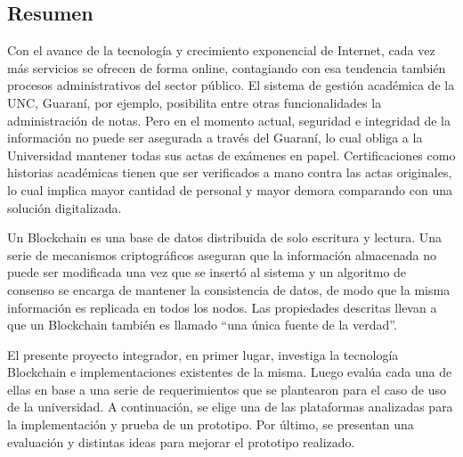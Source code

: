 \documentclass[11pt, oneside]{Thesis} %
\begin{document}
\clearpage %

\pagebreak


\newpage
\vspace*{\fill}
\begin{center}
\section*{Resumen}
\end{center}
Con el avance de la tecnología y crecimiento exponencial de Internet, cada vez más servicios se ofrecen de forma online, contagiando con esa tendencia también procesos administrativos del sector público. El sistema 
de gestión académica de la UNC, Guaraní, por ejemplo, posibilita entre otras funcionalidades la administración de notas. Pero en el momento actual, seguridad e integridad de la información no puede ser asegurada a través del Guaraní, lo cual obliga a la Universidad mantener todas sus actas de exámenes en papel. Certificaciones como historias académicas tienen que ser verificados a mano contra las actas originales, lo cual implica mayor cantidad de personal y mayor demora comparando con una solución digitalizada. 

Un Blockchain es una base de datos distribuida de solo escritura y lectura. Una serie de mecanismos criptográficos aseguran que la información almacenada no puede ser modificada una vez que se insertó al sistema y un algoritmo de consenso se encarga de mantener la consistencia de datos, de modo que la misma información es replicada en todos los nodos. Las propiedades descritas llevan a que un Blockchain también es llamado ``una única fuente de la verdad''. 

El presente proyecto integrador, en primer lugar, investiga la tecnología Blockchain e implementaciones existentes de la misma. Luego evalúa cada una de ellas en base a una serie de requerimientos que se plantearon para el caso de uso de la universidad. A continuación, se elige una de las plataformas analizadas para la implementación y prueba de un prototipo. Por último, se presentan una evaluación y distintas ideas para mejorar el prototipo realizado.
\vspace*{\fill}
\end{document}
